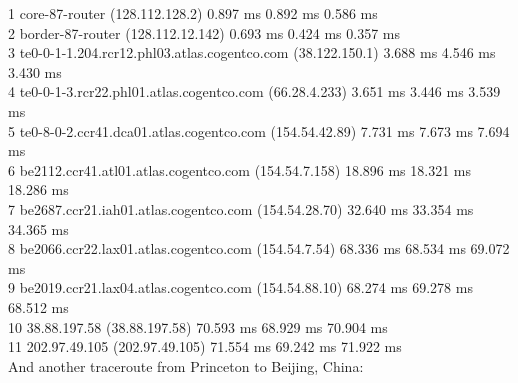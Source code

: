 \documentclass[paper=a4, fontsize=11pt]{scrartcl} %
\numberwithin{equation}{section} %
\numberwithin{figure}{section} %
\numberwithin{table}{section} %
\begin{document}
1  core-87-router (128.112.128.2)  0.897 ms  0.892 ms  0.586 ms \\
2  border-87-router (128.112.12.142)  0.693 ms  0.424 ms  0.357 ms \\
3  te0-0-1-1.204.rcr12.phl03.atlas.cogentco.com (38.122.150.1)  3.688 ms  4.546 ms  3.430 ms \\
4  te0-0-1-3.rcr22.phl01.atlas.cogentco.com (66.28.4.233)  3.651 ms  3.446 ms 3.539 ms \\
5  te0-8-0-2.ccr41.dca01.atlas.cogentco.com (154.54.42.89)  7.731 ms  7.673 ms 7.694 ms \\
6  be2112.ccr41.atl01.atlas.cogentco.com (154.54.7.158)  18.896 ms  18.321 ms  18.286 ms \\
7  be2687.ccr21.iah01.atlas.cogentco.com (154.54.28.70)  32.640 ms 33.354 ms  34.365 ms \\
8  be2066.ccr22.lax01.atlas.cogentco.com (154.54.7.54)  68.336 ms  68.534 ms 69.072 ms \\
9  be2019.ccr21.lax04.atlas.cogentco.com (154.54.88.10)  68.274 ms  69.278 ms  68.512 ms \\
10  38.88.197.58 (38.88.197.58)  70.593 ms 68.929 ms 70.904 ms \\
11  202.97.49.105 (202.97.49.105)  71.554 ms  69.242 ms  71.922 ms
\\

And another traceroute from Princeton to Beijing, China: \\
\end{document}
